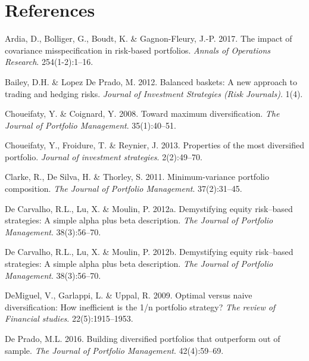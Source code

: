 \documentclass[11pt,preprint, authoryear]{elsarticle}
\numberwithin{equation}{section}
\numberwithin{figure}{section}
\numberwithin{table}{section}
\begin{document}
\newpage

\hypertarget{references}{%
\section*{References}\label{references}}

\hypertarget{refs}{}
\leavevmode\hypertarget{ref-ardia2017}{}%
Ardia, D., Bolliger, G., Boudt, K. \& Gagnon-Fleury, J.-P. 2017. The
impact of covariance misspecification in risk-based portfolios.
\emph{Annals of Operations Research}. 254(1-2):1--16.

\leavevmode\hypertarget{ref-lopez2012}{}%
Bailey, D.H. \& Lopez De Prado, M. 2012. Balanced baskets: A new
approach to trading and hedging risks. \emph{Journal of Investment
Strategies (Risk Journals)}. 1(4).

\leavevmode\hypertarget{ref-choueifaty2008}{}%
Choueifaty, Y. \& Coignard, Y. 2008. Toward maximum diversification.
\emph{The Journal of Portfolio Management}. 35(1):40--51.

\leavevmode\hypertarget{ref-choueifaty2013}{}%
Choueifaty, Y., Froidure, T. \& Reynier, J. 2013. Properties of the most
diversified portfolio. \emph{Journal of investment strategies}.
2(2):49--70.

\leavevmode\hypertarget{ref-clarke2011}{}%
Clarke, R., De Silva, H. \& Thorley, S. 2011. Minimum-variance portfolio
composition. \emph{The Journal of Portfolio Management}. 37(2):31--45.

\leavevmode\hypertarget{ref-rawl2012}{}%
De Carvalho, R.L., Lu, X. \& Moulin, P. 2012a. Demystifying equity
risk--based strategies: A simple alpha plus beta description. \emph{The
Journal of Portfolio Management}. 38(3):56--70.

\leavevmode\hypertarget{ref-leote}{}%
De Carvalho, R.L., Lu, X. \& Moulin, P. 2012b. Demystifying equity
risk--based strategies: A simple alpha plus beta description. \emph{The
Journal of Portfolio Management}. 38(3):56--70.

\leavevmode\hypertarget{ref-demiguel2009}{}%
DeMiguel, V., Garlappi, L. \& Uppal, R. 2009. Optimal versus naive
diversification: How inefficient is the 1/n portfolio strategy?
\emph{The review of Financial studies}. 22(5):1915--1953.

\leavevmode\hypertarget{ref-lopez}{}%
De Prado, M.L. 2016. Building diversified portfolios that outperform out
of sample. \emph{The Journal of Portfolio Management}. 42(4):59--69.
\end{document}
